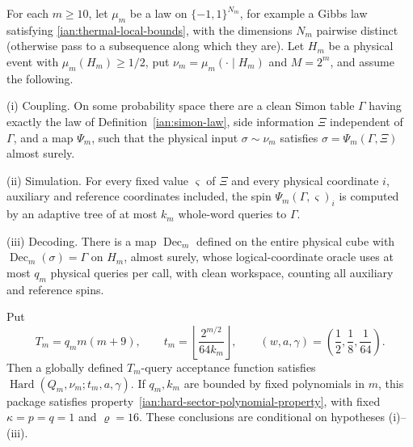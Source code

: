 \begin{theorem}
\label{ian:thermal-conditional-simon-compilation}
For each \(m\ge10\), let \(\mu_m\) be a law on \(\{-1,1\}^{N_m}\), for
example a Gibbs law satisfying \eqref{ian:thermal-local-bounds}, with
the dimensions \(N_m\) pairwise distinct (otherwise pass to a
subsequence along which they are). Let \(H_m\) be a physical event with
\(\mu_m(H_m)\ge1/2\), put \(\nu_m=\mu_m(\cdot\mid H_m)\) and \(M=2^m\),
and assume the following.

(i) Coupling. On some probability space there are a clean Simon table
\(\Gamma\) having exactly the law of Definition~\ref{ian:simon-law},
side information \(\Xi\) independent of \(\Gamma\), and a map
\(\Psi_m\), such that the physical input \(\sigma\sim\nu_m\) satisfies
\(\sigma=\Psi_m(\Gamma,\Xi)\) almost surely.

(ii) Simulation. For every fixed value \(\varsigma\) of \(\Xi\) and every
physical coordinate \(i\), auxiliary and reference coordinates
included, the spin \(\Psi_m(\Gamma,\varsigma)_i\) is computed by an adaptive
tree of at most \(k_m\) whole-word queries to \(\Gamma\).

(iii) Decoding. There is a map \(\operatorname{Dec}_m\) defined on the
entire physical cube with \(\operatorname{Dec}_m(\sigma)=\Gamma\) on
\(H_m\), almost surely, whose logical-coordinate oracle uses at most
\(q_m\) physical queries per call, with clean workspace, counting all
auxiliary and reference spins.

Put
\[
 T_m=q_m m(m+9),\qquad
 t_m=\left\lfloor\frac{2^{m/2}}{64k_m}\right\rfloor,
 \qquad
 (w,a,\gamma)=\left(\frac12,\frac18,\frac1{64}\right).
 \tag{36.29}
\]
Then a globally defined \(T_m\)-query acceptance function satisfies
\(\operatorname{Hard}(Q_m,\nu_m;t_m,a,\gamma)\).
If \(q_m,k_m\) are bounded by fixed polynomials in \(m\), this package
satisfies property~\eqref{ian:hard-sector-polynomial-property}, with
fixed \(\kappa=p=q=1\) and \(\varrho=16\).
These conclusions are conditional on hypotheses (i)--(iii).
\end{theorem}

